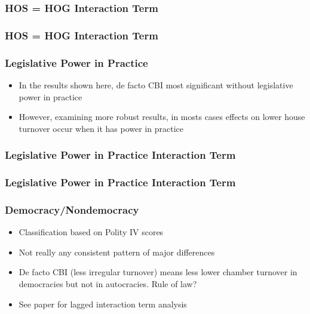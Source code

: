 \documentclass{beamer}
\begin{document}
    \begin{frame}
        \frametitle{HOS = HOG Interaction Term}
        {
            \let\oldcentering\centering
            \renewcommand\centering{\tiny\oldcentering}
            
        }
    \end{frame}

    \begin{frame}
        \frametitle{HOS = HOG Interaction Term}
        {
            \let\oldcentering\centering
            \renewcommand\centering{\tiny\oldcentering}
            
        }
    \end{frame}

    \begin{frame}
        \frametitle{Legislative Power in Practice}
        \begin{itemize}
            \item In the results shown here, de facto CBI most significant without legislative power in practice
            \item However, examining more robust results, in mosts cases effects on lower house turnover occur when it has power in practice
        \end{itemize}
    \end{frame}

    \begin{frame}
        \frametitle{Legislative Power in Practice Interaction Term}
        {
            \let\oldcentering\centering
            \renewcommand\centering{\tiny\oldcentering}
            
        }
    \end{frame}

    \begin{frame}
        \frametitle{Legislative Power in Practice Interaction Term}
        {
            \let\oldcentering\centering
            \renewcommand\centering{\tiny\oldcentering}
            
        }
    \end{frame}

    \begin{frame}
        \frametitle{Democracy/Nondemocracy}
        \begin{itemize}
            \item Classification based on Polity IV scores
            \item Not really any consistent pattern of major differences
            \item De facto CBI (less irregular turnover) means less lower chamber turnover in democracies but not in autocracies. Rule of law?
            \item See paper for lagged interaction term analysis
        \end{itemize}
    \end{frame}
\end{document}
